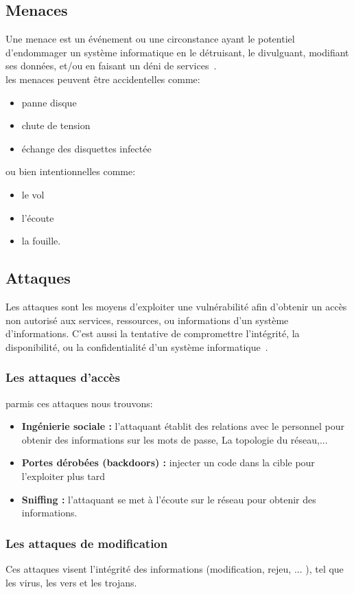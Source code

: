 \subsection{Menaces}
Une menace est un événement ou une circonstance ayant le potentiel d'endommager un système informatique en le détruisant, le divulguant, modifiant ses données, et/ou en faisant un déni de services~\cite{men}.\\
les menaces peuvent être accidentelles comme:
\begin{itemize}
\item panne disque
\item chute de tension
\item échange des disquettes infectée
\end{itemize}
ou bien intentionnelles comme:
\begin{itemize}
\item le vol
\item l'écoute
\item la fouille.
\end{itemize}
\subsection{Attaques}
Les attaques sont les moyens d'exploiter une vulnérabilité afin d'obtenir un accès non autorisé aux services, ressources, ou informations d'un système d'informations. C'est aussi la tentative de compromettre l'intégrité, la disponibilité, ou la confidentialité d'un système informatique~\cite{men}.
\subsubsection{Les attaques d'accès}
parmis ces attaques nous trouvons:
\begin{itemize}
\item \textbf{Ingénierie sociale :} l'attaquant établit des relations avec le personnel pour obtenir des
informations sur les mots de passe, La topologie du réseau,...
\item \textbf{Portes dérobées (backdoors) :} injecter un code dans la cible pour l'exploiter plus tard
\item \textbf{Sniffing :} l'attaquant se met à l'écoute sur le réseau pour obtenir des informations.
\end{itemize}
\subsubsection{Les attaques de modification}
Ces attaques visent l'intégrité des informations (modification, rejeu, ... ), tel que les virus, les vers et les trojans.
